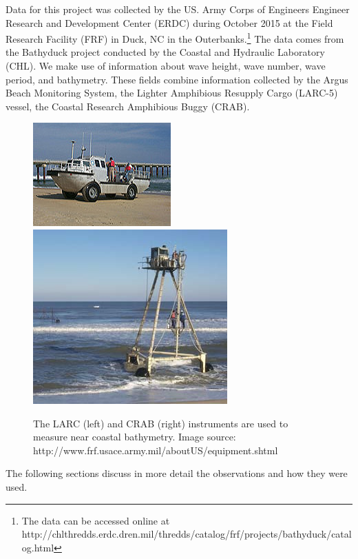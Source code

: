 Data for this project was collected by the US. Army Corps of Engineers Engineer Research and Development Center (ERDC) during October 2015 at the Field Research Facility (FRF) in Duck, NC in the Outerbanks.\footnote{The data can be accessed online at http://chlthredds.erdc.dren.mil/thredds/catalog/frf/projects/bathyduck/catalog.html} The data comes from the Bathyduck project conducted by the Coastal and Hydraulic Laboratory (CHL). We make use of information about wave height, wave number, wave period, and bathymetry. These fields combine information collected by the Argus Beach Monitoring System, the Lighter Amphibious Resupply Cargo (LARC-5) vessel, the Coastal Research Amphibious Buggy (CRAB). 

\begin{figure}[h]
\includegraphics[width=.48\linewidth]{img/LARC.jpg}\hfill
\includegraphics[width=.48\linewidth]{img/CRAB2.jpg}
\caption{The LARC (left) and CRAB (right) instruments are used to measure near coastal bathymetry. Image source: http://www.frf.usace.army.mil/aboutUS/equipment.shtml}
\end{figure}

The following sections discuss in more detail the observations and how they were used.

